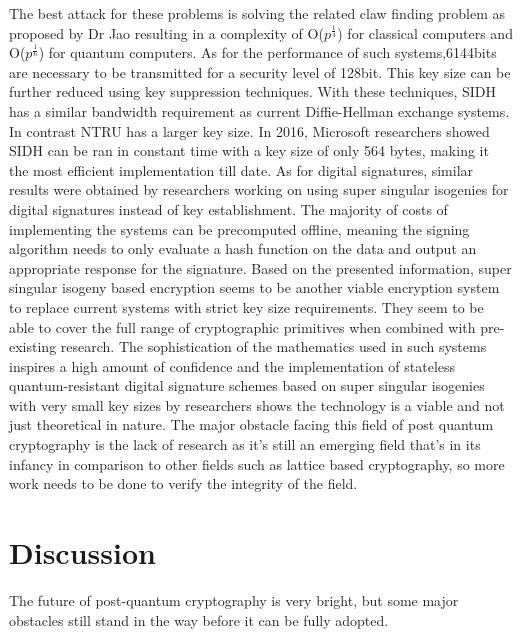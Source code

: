\documentclass[10pt,a4paper]{article}
\begin{document}
The best attack for these problems is solving the related claw finding problem as proposed by Dr Jao%
resulting in a complexity of O(\(p^\frac{1}{4}\)) for classical computers and O(\(p^\frac{1}{6}\)) for quantum computers. 
\newline
\newline
As for the performance of such systems,6144bits are necessary to be transmitted for a security level of 128bit. This key size can be further reduced using key suppression techniques. With these techniques, SIDH has a similar bandwidth requirement as current Diffie-Hellman exchange systems. In contrast NTRU has a larger key size.
In 2016, Microsoft researchers showed SIDH can be ran in constant time with a key size of only 564 bytes, making it the most efficient implementation till date.
\newline
As for digital signatures, similar results were obtained by researchers working on using super singular isogenies for digital signatures instead of key establishment. The majority of costs of implementing the systems can be precomputed offline, meaning the signing algorithm needs to only evaluate a hash function on the data and output an appropriate response for the signature.
\newline
\newline
Based on the presented information, super singular isogeny based encryption seems to be another viable encryption system to replace current systems with strict key size requirements. They seem to be able to cover the full range of cryptographic primitives when combined with pre-existing research. The sophistication of the mathematics used in such systems inspires a high amount of confidence and the implementation of stateless quantum-resistant digital signature schemes based on super singular isogenies with very small key sizes by researchers shows the technology is a viable and not just theoretical in nature. The major obstacle facing this field of post quantum cryptography is the lack of research as it's still an emerging field that's in its infancy in comparison to other fields such as lattice based cryptography, so more work needs to be done to verify the integrity of the field.
\section{Discussion}
The future of post-quantum cryptography is very bright, but some major obstacles still stand in the way before it can be fully adopted.
\end{document}
